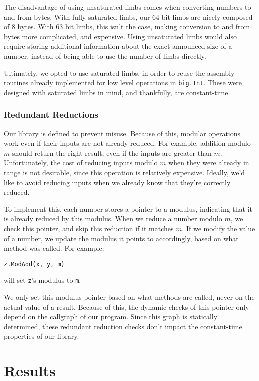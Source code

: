 \documentclass[11pt, a4paper]{article} %
\begin{document}
{The disadvantage of using unsaturated limbs comes when converting
numbers to and from bytes. With fully saturated limbs, our
$64$ bit limbs are nicely composed of $8$ bytes. With $63$ bit limbs,
this isn't the case, making conversion to and from bytes more
complicated, and expensive. Using unsaturated limbs would
also require storing additional information about the exact
announced size of a number, instead of being able to use
the number of limbs directly.

Ultimately, we opted to use saturated limbs, in order to reuse
the assembly routines already implemented for low level
operations in \texttt{big.Int}. These were designed with
saturated limbs in mind, and thankfully, are constant-time.

\subsubsection{Redundant Reductions}

Our library is defined to prevent misuse. Because of this,
modular operations work even if their inputs are not already
reduced. For example, addition modulo $m$ should return the
right result, even if the inputs are greater than $m$.
Unfortunately, the cost of reducing inputs modulo $m$ when
they were already in range is not desirable, since this operation
is relatively expensive. Ideally, we'd like to avoid reducing
inputs when we already know that they're correctly reduced.

To implement this, each number stores a pointer to a modulus,
indicating that it is already reduced by this modulus.
When we reduce a number modulo $m$, we check this pointer,
and skip this reduction if it matches $m$. If we modify
the value of a number, we update the modulus it points to
accordingly, based on what method was called.
For example:
\begin{verbatim}
z.ModAdd(x, y, m)
\end{verbatim}
will set \texttt{z}'s modulus to \texttt{m}.

We only set this modulus pointer based on what methods are called,
never on the actual value of a result. Because of this, the dynamic
checks of this pointer only depend on the callgraph of our program.
Since this graph is statically determined, these redundant reduction
checks don't impact the constant-time properties of our library.

\section{Results}

}
\end{document}
